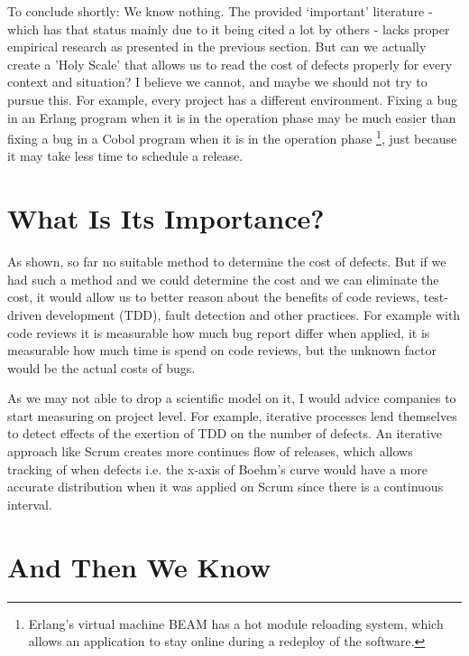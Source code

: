 To conclude shortly: We know nothing.
The provided `important' literature - which has that status mainly due to it being cited a lot by others - lacks proper empirical research as presented in the previous section.
But can we actually create a 'Holy Scale' that allows us to read the cost of defects properly for every context and situation?
I believe we cannot, and maybe we should not try to pursue this.
For example, every project has a different environment.
Fixing a bug in an Erlang program when it is in the operation phase may be much easier than fixing a bug in a Cobol program when it is in the operation phase
\footnote{Erlang's virtual machine BEAM has a hot module reloading system, which allows an application to stay online during a redeploy of the software.},
just because it may take less time to schedule a release.

\section*{What Is Its Importance?}

As shown, so far no suitable method to determine the cost of defects.
But if we had such a method and we could determine the cost and we can eliminate the cost,
it would allow us to better reason about the benefits of code reviews, test-driven development (TDD), fault detection and other practices.
For example with code reviews it is measurable how much bug report differ when applied, it is measurable how much time is spend on code reviews, but the unknown factor would be the actual costs of bugs.

As we may not able to drop a scientific model on it, I would advice companies to start measuring on project level. For example, iterative processes lend themselves to detect effects of the exertion of TDD on the number of defects.
An iterative approach like Scrum creates more continues flow of releases, which allows tracking of when defects i.e. the x-axis of Boehm's curve would have a more accurate distribution when it was applied on Scrum since there is a continuous interval.

\section*{And Then We Know}

